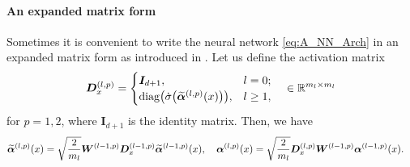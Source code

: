 

\paragraph{An expanded matrix form}
Sometimes it is convenient to write the neural network \cref{eq:A_NN_Arch} in an expanded matrix form as introduced in \citet{allen-zhu2019_ConvergenceTheory}.
Let us define the activation matrix
\begin{align*}
  \bm{D}^{(l,p)}_{\x}=
  \begin{cases}
    \bm{I}_{d+1}, &l=0;\\
    \mr{diag}\xkm{\dot\sigma\xkm{\widetilde{\bm{\alpha}}^{(l,p)}\xkm{\x}}}, &l \geq 1,
  \end{cases}\quad\in\mb{R}^{m_l\times m_l}
\end{align*}
for $p=1,2$, where $\bm{I}_{d+1}$ is the identity matrix.
Then, we have
\begin{align*}
  \widetilde{\bm{\alpha}}^{(l,p)}(x) &= \sqrt{\frac{2}{m_l}} \bm{W}^{(l-1,p)}\bm{D}^{(l-1,p)}_{x}\widetilde{\bm{\alpha}}^{(l-1,p)}(x),\quad
  {\bm{\alpha}}^{(l,p)}(x)
  = \sqrt{\frac2{m_l}}\bm{D}^{(l,p)}_{x}\bm{W}^{(l-1,p)}{\bm{\alpha}}^{(l-1,p)}(x).
\end{align*}

